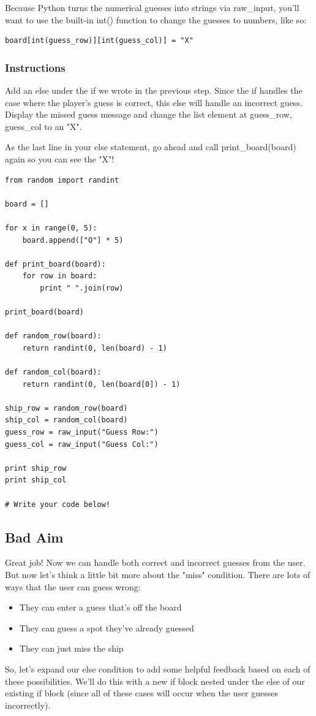 \documentclass[12pt,a4paper,final,twoside,onecolumn,titlepage]{book}
\begin{document}
Because Python turns the numerical guesses into strings via raw\_input, you'll want to use the built-in int() function to change the guesses to numbers, like so:
\begin{lstlisting}
board[int(guess_row)][int(guess_col)] = "X"
\end{lstlisting}
\subsubsection{Instructions}

Add an else under the if we wrote in the previous step. Since the if handles the case where the player's guess is correct, this else will handle an incorrect guess. Display the missed guess message and change the list element at guess\_row, guess\_col to an "X".

As the last line in your else statement, go ahead and call print\_board(board) again so you can see the "X"!

\begin{lstlisting}
from random import randint

board = []

for x in range(0, 5):
    board.append(["O"] * 5)

def print_board(board):
    for row in board:
        print " ".join(row)

print_board(board)

def random_row(board):
    return randint(0, len(board) - 1)

def random_col(board):
    return randint(0, len(board[0]) - 1)

ship_row = random_row(board)
ship_col = random_col(board)
guess_row = raw_input("Guess Row:")
guess_col = raw_input("Guess Col:")

print ship_row
print ship_col

# Write your code below!

\end{lstlisting}

\subsection{Bad Aim}

Great job! Now we can handle both correct and incorrect guesses from the user. But now let’s think a little bit more about the "miss" condition. There are lots of ways that the user can guess wrong:
\begin{itemize}
\item    They can enter a guess that's off the board
\item    They can guess a spot they’ve already guessed
\item    They can just miss the ship
\end{itemize}
So, let’s expand our else condition to add some helpful feedback based on each of these possibilities. We'll do this with a new if block nested under the else of our existing if block (since all of these cases will occur when the user guesses incorrectly).
\end{document}
